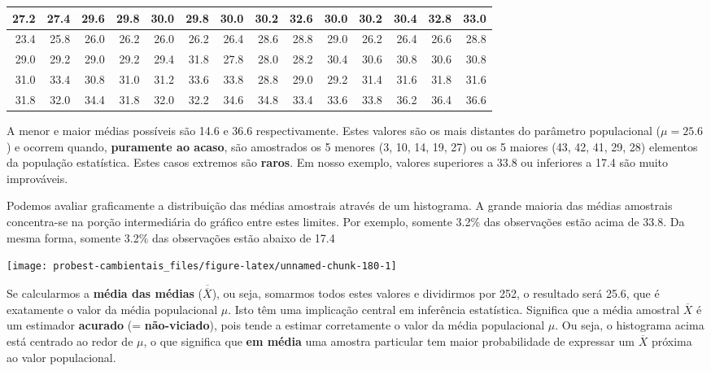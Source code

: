 \documentclass[
]{book}
\begin{document}
\begin{tabular}{r|r|r|r|r|r|r|r|r|r|r|r|r|r}
\hline
27.2 & 27.4 & 29.6 & 29.8 & 30.0 & 29.8 & 30.0 & 30.2 & 32.6 & 30.0 & 30.2 & 30.4 & 32.8 & 33.0\\
\hline
23.4 & 25.8 & 26.0 & 26.2 & 26.0 & 26.2 & 26.4 & 28.6 & 28.8 & 29.0 & 26.2 & 26.4 & 26.6 & 28.8\\
\hline
29.0 & 29.2 & 29.0 & 29.2 & 29.4 & 31.8 & 27.8 & 28.0 & 28.2 & 30.4 & 30.6 & 30.8 & 30.6 & 30.8\\
\hline
31.0 & 33.4 & 30.8 & 31.0 & 31.2 & 33.6 & 33.8 & 28.8 & 29.0 & 29.2 & 31.4 & 31.6 & 31.8 & 31.6\\
\hline
31.8 & 32.0 & 34.4 & 31.8 & 32.0 & 32.2 & 34.6 & 34.8 & 33.4 & 33.6 & 33.8 & 36.2 & 36.4 & 36.6\\
\hline
\end{tabular}

A menor e maior médias possíveis são 14.6 e 36.6 respectivamente. Estes valores são os mais distantes do parâmetro populacional (\(\mu = 25.6\)) e ocorrem quando, \textbf{puramente ao acaso}, são amostrados os 5 menores (3, 10, 14, 19, 27) ou os 5 maiores (43, 42, 41, 29, 28) elementos da população estatística. Estes casos extremos são \textbf{raros}. Em nosso exemplo, valores superiores a 33.8 ou inferiores a 17.4 são muito improváveis.

Podemos avaliar graficamente a distribuição das médias amostrais através de um histograma. A grande maioria das médias amostrais concentra-se na porção intermediária do gráfico entre estes limites. Por exemplo, somente 3.2\% das observações estão acima de 33.8. Da mesma forma, somente 3.2\% das observações estão abaixo de 17.4

\begin{center}\texttt{[image: probest-cambientais\_files/figure-latex/unnamed-chunk-180-1]} \end{center}

Se calcularmos a \textbf{média das médias} (\(\overline{\overline{X}}\)), ou seja, somarmos todos estes valores e dividirmos por 252, o resultado será 25.6, que é exatamente o valor da média populacional \(\mu\). Isto têm uma implicação central em inferência estatística. Significa que a média amostral \(\overline{X}\) é um estimador \textbf{acurado} (= \textbf{não-viciado}), pois tende a estimar corretamente o valor da média populacional \(\mu\). Ou seja, o histograma acima está centrado ao redor de \(\mu\), o que significa que \textbf{em média} uma amostra particular tem maior probabilidade de expressar um \(\overline{X}\) próxima ao valor populacional.
\end{document}
